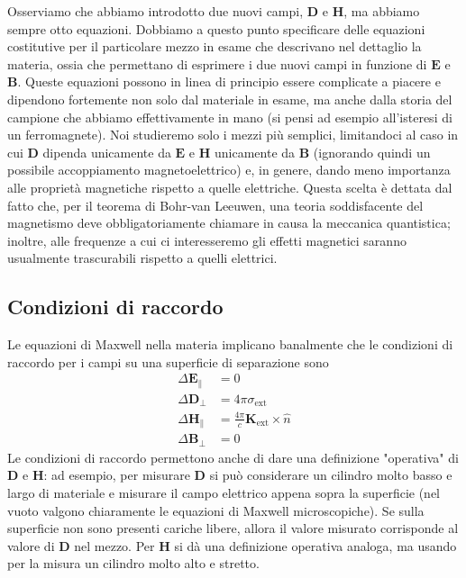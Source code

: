 \documentclass[a4paper,11pt]{book}
\renewcommand{\vec}[1]{\mathbf{#1}}
\theoremstyle{theorem}
\theoremstyle{definition}
\begin{document}
 Osserviamo che abbiamo introdotto due nuovi campi, $\vec{D}$ e $\vec{H}$, ma abbiamo sempre otto equazioni. Dobbiamo a questo punto specificare delle equazioni costitutive per il particolare mezzo in esame che descrivano nel dettaglio la materia, ossia che permettano di esprimere i due nuovi campi in funzione di $\vec{E}$ e $\vec{B}$. Queste equazioni possono in linea di principio essere complicate a piacere e dipendono fortemente non solo dal materiale in esame, ma anche dalla storia del campione che abbiamo effettivamente in mano (si pensi ad esempio all'isteresi di un ferromagnete). Noi studieremo solo i mezzi più semplici, limitandoci al caso in cui $\vec{D}$ dipenda unicamente da $\vec{E}$ e $\vec{H}$ unicamente da $\vec{B}$ (ignorando quindi un possibile accoppiamento magnetoelettrico) e, in genere, dando meno importanza alle proprietà magnetiche rispetto a quelle elettriche. Questa scelta è dettata dal fatto che, per il teorema di Bohr-van Leeuwen, una teoria soddisfacente del magnetismo deve obbligatoriamente chiamare in causa la meccanica quantistica; inoltre, alle frequenze a cui ci interesseremo gli effetti magnetici saranno usualmente trascurabili rispetto a quelli elettrici.
 \subsection{Condizioni di raccordo}
 Le equazioni di Maxwell nella materia implicano banalmente che le condizioni di raccordo per i campi su una superficie di separazione sono
 \begin{align*}
 	\Delta\vec{E}_\parallel&=0\\
 	\Delta\vec{D}_\perp&=4\pi\sigma_{\textrm{ext}}\\\Delta\vec{H}_\parallel &=\frac{4\pi}{c}\vec{K}_\textrm{ext}\times\hat{n}\\\Delta\vec{B}_\perp&=0
 \end{align*}
 Le condizioni di raccordo permettono anche di dare una definizione "operativa" di $\vec{D}$ e $\vec{H}$: ad esempio, per misurare $\vec{D}$ si può considerare un cilindro molto basso e largo di materiale e misurare il campo elettrico appena sopra la superficie (nel vuoto valgono chiaramente le equazioni di Maxwell microscopiche). Se sulla superficie non sono presenti cariche libere, allora il valore misurato corrisponde al valore di $\vec{D}$ nel mezzo. Per $\vec{H}$ si dà una definizione operativa analoga, ma usando per la misura un cilindro molto alto e stretto.
\end{document}
